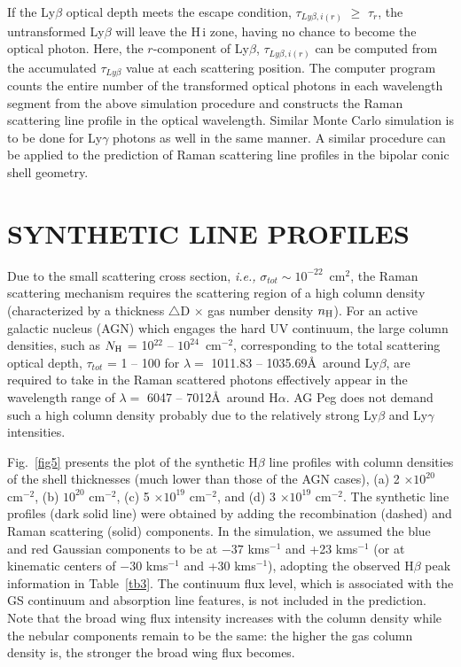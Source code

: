 \documentclass[a4paper,fleqn,usenatbib,useAMS]{mnras}
\def\ie{{\it i.e.,} }
\def\ha{H{$\alpha$}}
\def\hb{H{$\beta$}}
\def\hi{H\,{\sc i}}
\def\kms{km\hspace{1pt}s$^{-1}$}
\begin{document}
{If the Ly$\beta$ optical depth meets the escape condition, $\tau_{Ly\beta,i(r)}$
$\geq$ $\tau_{r}$, the untransformed Ly$\beta$ will leave the {\hi} zone, having no chance to become the optical photon. Here, the $r$-component of  Ly$\beta$,  $\tau_{Ly\beta,i(r)}$ can be computed from the accumulated  $\tau_{Ly\beta}$ value at each scattering position. The computer program counts the entire number of the transformed optical photons in each wavelength segment from the above simulation procedure and constructs the Raman scattering line profile in the optical wavelength. Similar Monte Carlo simulation is to be done for Ly$\gamma$ photons as well in the same manner.
A similar procedure can be applied to the prediction of Raman scattering line profiles in the bipolar conic shell geometry.




\section{SYNTHETIC LINE PROFILES}

Due to the small scattering cross section, {\ie} $\sigma_{tot} \sim 10^{-22}$~cm$^2$, the Raman scattering mechanism requires the scattering region of a high column density (characterized by a thickness $\triangle$D $\times$ gas number density $n_{\rm H}$). For an active galactic nucleus (AGN) which engages the hard UV continuum, the large column densities, such as $N_{\rm H}$ = 10$^{22}$ -- $10^{24}$~cm$^{-2}$, corresponding to the total scattering optical depth, $\tau_{tot}$ = 1 -- 100 for $\lambda = $ 1011.83 -- 1035.69\AA\, around Ly$\beta$, are required to take in the Raman scattered photons effectively appear in the wavelength range of $\lambda = $ 6047 -- 7012\AA\, around {\ha}.
AG Peg does not demand such a high column density probably due to the relatively strong Ly$\beta$ and Ly$\gamma$ intensities.

Fig.~\ref{fig5} presents the plot of the synthetic {\hb} line profiles with  column densities of the shell thicknesses (much lower than those of the AGN cases), (a) 2 $\times 10^{20}$ cm$^{-2}$, (b) $10^{20}$ cm$^{-2}$, (c) 5 $\times 10^{19}$ cm$^{-2}$, and (d) 3 $\times 10^{19}$ cm$^{-2}$. The synthetic line profiles (dark solid line) were obtained by adding the recombination (dashed) and Raman scattering (solid) components. In the simulation, we assumed the blue and red Gaussian components to be at $-37$ {\kms} and +23 {\kms} (or at kinematic centers of $-30$ {\kms} and +30 {\kms}), adopting the observed {\hb} peak information in Table~\ref{tb3}. The continuum flux level, which is associated with the GS continuum and absorption line features, is not included in the prediction.
Note that the broad wing flux intensity increases with the column density while the nebular components remain to be the same: the higher the gas column density is, the stronger the broad wing flux becomes.

}
\end{document}
